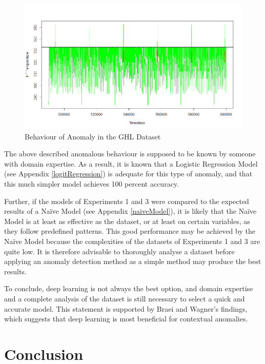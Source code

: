 \begin{figure}[h]
	\centering
	\includegraphics[scale=0.45]{Figures/review}
	\decoRule
	\caption[Behaviour of Anomaly in the GHL Dataset]{Behaviour of Anomaly in the GHL Dataset \parencite{own}}
	\label{fig:review}
\end{figure}

The above described anomalous behaviour is supposed to be known by someone with domain expertise. As a result, it is known that a Logistic Regression Model (see Appendix \ref{logitRegression}) is adequate for this type of anomaly, and that this much simpler model achieves 100 percent accuracy. 

Further, if the models of Experiments 1 and 3 were compared to the expected results of a Naïve Model (see Appendix \ref{naiveModel}), it is likely that the Naïve Model is at least as effective as the dataset, or at least on certain variables, as they follow predefined patterns. This good performance may be achieved by the Naïve Model because the complexities of the datasets of Experiments 1 and 3 are quite low. It is therefore advisable to thoroughly analyse a dataset before applying an anomaly detection method as a simple method may produce the best results.    

To conclude, deep learning is not always the best option, and domain expertise and a complete analysis of the dataset is still necessary to select a quick and accurate model. This statement is supported by Braei and Wagner's \parencite*{Braei2020} findings, which suggests that deep learning is most beneficial for contextual anomalies.   

\chapter{Conclusion}

